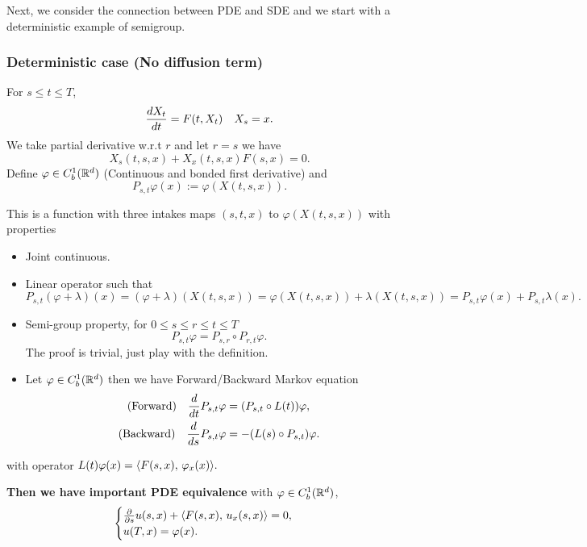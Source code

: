 Next, we consider the connection between PDE and SDE and we start with a deterministic example of semigroup.

\subsubsection{Deterministic case (No diffusion term)}
For $s\leq t\leq T$,
\begin{equation*}
    \frac{\mathop{}\!d X_t}{\mathop{}\!d t} = F(t,X_t)\quad X_s = x.
\end{equation*}
We take partial derivative w.r.t $r$ and let $r = s$ we have
\begin{equation*}
    \boxed{X_s(t,s,x)+X_x(t,s,x)F(s,x) = 0}.
\end{equation*}
Define $\varphi \in C_b^1(\mathbb{R}^d)$ (Continuous and bonded first derivative) and
\begin{equation*}
    P_{s,t}\varphi(x) := \varphi(X(t,s,x)).
\end{equation*}

\begin{rem}
This is a function with three intakes maps $(s,t,x)$ to $\varphi(X(t,s,x))$ with properties
\begin{itemize}
    \item Joint continuous.
    
    \item Linear operator such that
    \begin{equation*}
        P_{s,t}(\varphi + \lambda)(x) = (\varphi + \lambda)(X(t,s,x)) = \varphi(X(t,s,x)) + \lambda(X(t,s,x)) = P_{s,t}\varphi(x)+P_{s,t}\lambda(x).
    \end{equation*}
    
    \item Semi-group property, for $0\leq s \leq r\leq t\leq T$
    \begin{equation*}
        P_{s,t}\varphi = P_{s,r}\circ P_{r,t} \varphi.
    \end{equation*}
    The proof is trivial, just play with the definition.
    
    \item Let $\varphi \in C_b^1(\mathbb{R}^d)$ then we have Forward/Backward Markov equation
    \begin{align*}
        \text{(Forward)}\quad \frac{\mathop{}\!d}{\mathop{}\!d t} P_{s,t}\varphi &= (P_{s,t}\circ L(t))\varphi, \\
         \text{(Backward)} \quad \frac{\mathop{}\!d}{\mathop{}\!d s} P_{s,t}\varphi &= -(L(s)\circ P_{s,t})\varphi.
    \end{align*}
\end{itemize} 
with operator $L(t)\varphi(x) = \langle {F(s,x)},\,{\varphi_x(x)} \rangle.$

\textbf{Then we have important PDE equivalence} with $\varphi \in C_b^1(\mathbb{R}^d)$,
\begin{equation*}
    \begin{cases}
        \frac{\partial }{\partial s}u(s,x) + \langle {F(s,x)},\,{u_x(s,x)} \rangle=0, \\
        u(T,x) = \varphi(x).
    \end{cases}
\end{equation*}
\end{rem}

